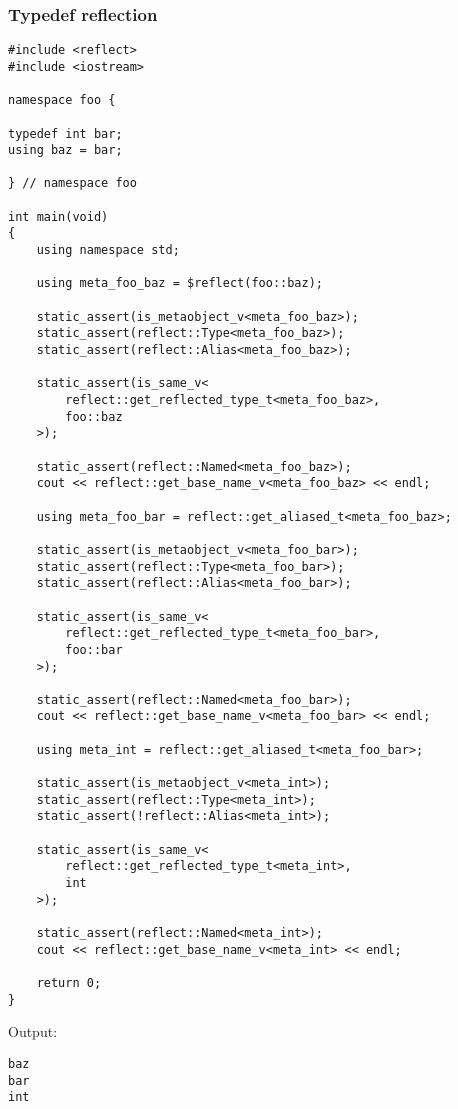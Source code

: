 \subsubsection{Typedef reflection}

\begin{verbatim}
#include <reflect>
#include <iostream>

namespace foo {

typedef int bar;
using baz = bar;

} // namespace foo

int main(void)
{
	using namespace std;

	using meta_foo_baz = $reflect(foo::baz);

	static_assert(is_metaobject_v<meta_foo_baz>);
	static_assert(reflect::Type<meta_foo_baz>);
	static_assert(reflect::Alias<meta_foo_baz>);

	static_assert(is_same_v<
		reflect::get_reflected_type_t<meta_foo_baz>,
		foo::baz
	>);

	static_assert(reflect::Named<meta_foo_baz>);
	cout << reflect::get_base_name_v<meta_foo_baz> << endl;

	using meta_foo_bar = reflect::get_aliased_t<meta_foo_baz>;

	static_assert(is_metaobject_v<meta_foo_bar>);
	static_assert(reflect::Type<meta_foo_bar>);
	static_assert(reflect::Alias<meta_foo_bar>);

	static_assert(is_same_v<
		reflect::get_reflected_type_t<meta_foo_bar>,
		foo::bar
	>);

	static_assert(reflect::Named<meta_foo_bar>);
	cout << reflect::get_base_name_v<meta_foo_bar> << endl;

	using meta_int = reflect::get_aliased_t<meta_foo_bar>;

	static_assert(is_metaobject_v<meta_int>);
	static_assert(reflect::Type<meta_int>);
	static_assert(!reflect::Alias<meta_int>);

	static_assert(is_same_v<
		reflect::get_reflected_type_t<meta_int>,
		int
	>);

	static_assert(reflect::Named<meta_int>);
	cout << reflect::get_base_name_v<meta_int> << endl;

	return 0;
}

\end{verbatim}

Output:

\begin{verbatim}
baz
bar
int
\end{verbatim}

